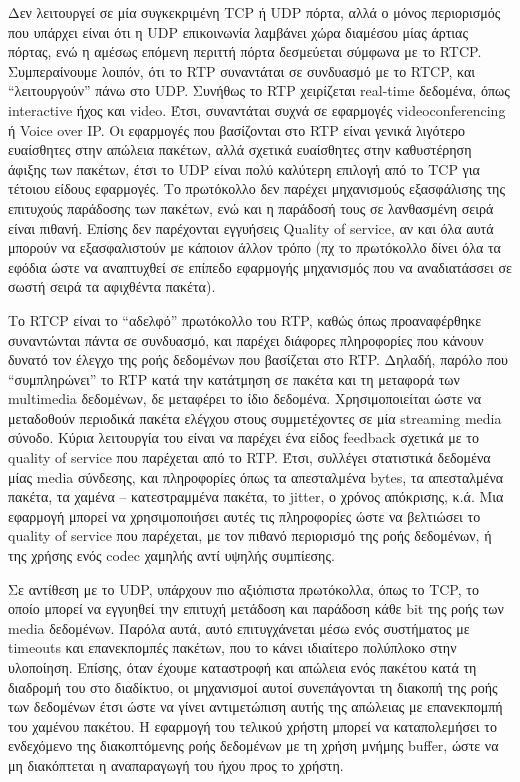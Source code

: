 \documentclass{article}
\begin{document}
Δεν λειτουργεί σε μία συγκεκριμένη TCP ή UDP πόρτα, αλλά ο μόνος περιορισμός που υπάρχει είναι ότι η UDP επικοινωνία λαμβάνει χώρα διαμέσου μίας άρτιας πόρτας, ενώ η αμέσως επόμενη περιττή πόρτα δεσμεύεται σύμφωνα με το RTCP.
Συμπεραίνουμε λοιπόν, ότι το RTP συναντάται σε συνδυασμό με το RTCP, και “λειτουργούν” πάνω στο UDP.
Συνήθως το RTP χειρίζεται real-time δεδομένα, όπως interactive ήχος και video.
Έτσι, συναντάται συχνά σε εφαρμογές videoconferencing ή Voice over IP.
Οι εφαρμογές που βασίζονται στο RTP είναι γενικά λιγότερο ευαίσθητες στην απώλεια πακέτων, αλλά σχετικά ευαίσθητες στην καθυστέρηση άφιξης των πακέτων, έτσι το UDP είναι πολύ καλύτερη επιλογή από το TCP για τέτοιου είδους εφαρμογές.
Το πρωτόκολλο δεν παρέχει μηχανισμούς εξασφάλισης της επιτυχούς παράδοσης των πακέτων, ενώ και η παράδοσή τους σε λανθασμένη σειρά είναι πιθανή.
Επίσης δεν παρέχονται εγγυήσεις Quality of service, αν και όλα αυτά μπορούν να εξασφαλιστούν με κάποιον άλλον τρόπο (πχ το πρωτόκολλο δίνει όλα τα εφόδια ώστε να αναπτυχθεί σε επίπεδο εφαρμογής μηχανισμός που να αναδιατάσσει σε σωστή σειρά τα αφιχθέντα πακέτα).

Το RTCP είναι το “αδελφό” πρωτόκολλο του RTP, καθώς όπως προαναφέρθηκε συναντώνται πάντα σε συνδυασμό, και παρέχει διάφορες πληροφορίες που κάνουν δυνατό τον έλεγχο της ροής δεδομένων που βασίζεται στο RTP.
Δηλαδή, παρόλο που “συμπληρώνει” το RTP κατά την κατάτμηση σε πακέτα και τη μεταφορά των multimedia δεδομένων, δε μεταφέρει το ίδιο δεδομένα.
Χρησιμοποιείται ώστε να μεταδοθούν περιοδικά πακέτα ελέγχου στους συμμετέχοντες σε μία streaming media σύνοδο.
Κύρια λειτουργία του είναι να παρέχει ένα είδος feedback σχετικά με το quality of service που παρέχεται από το RTP.
Έτσι, συλλέγει στατιστικά δεδομένα μίας media σύνδεσης, και πληροφορίες όπως τα απεσταλμένα bytes, τα απεσταλμένα πακέτα, τα χαμένα – κατεστραμμένα πακέτα, το jitter, ο χρόνος απόκρισης, κ.ά.
Μια εφαρμογή μπορεί να χρησιμοποιήσει αυτές τις πληροφορίες ώστε να βελτιώσει το quality of service που παρέχεται, με τον πιθανό περιορισμό της ροής δεδομένων, ή της χρήσης ενός codec χαμηλής αντί υψηλής συμπίεσης.

Σε αντίθεση με το UDP, υπάρχουν πιο αξιόπιστα πρωτόκολλα, όπως το TCP, το οποίο μπορεί να εγγυηθεί την επιτυχή μετάδοση και παράδοση κάθε bit της ροής των media δεδομένων.
Παρόλα αυτά, αυτό επιτυγχάνεται μέσω ενός συστήματος με timeouts και επανεκπομπές πακέτων, που το κάνει ιδιαίτερο πολύπλοκο στην υλοποίηση.
Επίσης, όταν έχουμε καταστροφή και απώλεια ενός πακέτου κατά τη διαδρομή του στο διαδίκτυο, οι μηχανισμοί αυτοί συνεπάγονται τη διακοπή της ροής των δεδομένων έτσι ώστε να γίνει αντιμετώπιση αυτής της απώλειας με επανεκπομπή του χαμένου πακέτου.
Η εφαρμογή του τελικού χρήστη μπορεί να καταπολεμήσει το ενδεχόμενο της διακοπτόμενης ροής δεδομένων με τη χρήση μνήμης buffer, ώστε να μη διακόπτεται η αναπαραγωγή του ήχου προς το χρήστη.
\end{document}
